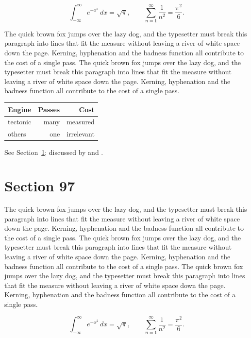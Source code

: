 \documentclass{article}
\begin{document}
\begin{equation}\label{eq:96}
\int_{-\infty}^{\infty} e^{-x^{2}}\,dx = \sqrt{\pi}, \qquad
\sum_{n=1}^{\infty} \frac{1}{n^{2}} = \frac{\pi^{2}}{6}.
\end{equation}

The quick brown fox jumps over the lazy dog, and the typesetter must break this paragraph into lines that fit the measure without leaving a river of white space down the page. Kerning, hyphenation and the badness function all contribute to the cost of a single pass. The quick brown fox jumps over the lazy dog, and the typesetter must break this paragraph into lines that fit the measure without leaving a river of white space down the page. Kerning, hyphenation and the badness function all contribute to the cost of a single pass. 

\begin{center}
\begin{tabular}{lrr}
\toprule
Engine & Passes & Cost \\
\midrule
tectonic & many & measured \\
others & one & irrelevant \\
\bottomrule
\end{tabular}
\end{center}

See Section~\ref{sec:97}; discussed by \textcite{k2} and \textcite{l4}.
\section{Section 97}
\label{sec:97}
The quick brown fox jumps over the lazy dog, and the typesetter must break this paragraph into lines that fit the measure without leaving a river of white space down the page. Kerning, hyphenation and the badness function all contribute to the cost of a single pass. The quick brown fox jumps over the lazy dog, and the typesetter must break this paragraph into lines that fit the measure without leaving a river of white space down the page. Kerning, hyphenation and the badness function all contribute to the cost of a single pass. The quick brown fox jumps over the lazy dog, and the typesetter must break this paragraph into lines that fit the measure without leaving a river of white space down the page. Kerning, hyphenation and the badness function all contribute to the cost of a single pass. 

\begin{equation}\label{eq:97}
\int_{-\infty}^{\infty} e^{-x^{2}}\,dx = \sqrt{\pi}, \qquad
\sum_{n=1}^{\infty} \frac{1}{n^{2}} = \frac{\pi^{2}}{6}.
\end{equation}
\end{document}
